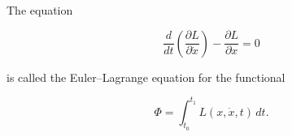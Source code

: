 The equation

$$\frac{d}{dt} \left( \frac{\partial L}{\partial \dot{x}} \right) - \frac{\partial L}{\partial x} = 0$$

is called the Euler–Lagrange equation for the functional

$$\Phi = \int_{t_0}^{t_1} L(x, \dot{x}, t)\, dt.$$
